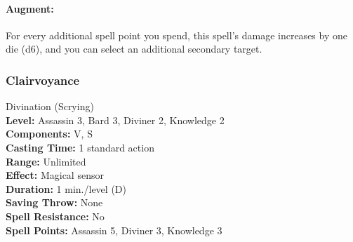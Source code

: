 \paragraph{Augment:} For every additional spell point you spend, 
this spell's damage increases by one die (d6), and you can select an additional secondary target.
% 
% 
% 

\subsubsection{Clairvoyance}
\label{Spell:Clairvoyance}
Divination (Scrying)
\\ \textbf{Level:} Assassin 3, Bard 3, Diviner 2, Knowledge 2
\\ \textbf{Components:} V, S
\\ \textbf{Casting Time:} 1 standard action
\\ \textbf{Range:} Unlimited
\\ \textbf{Effect:} Magical sensor
\\ \textbf{Duration:} 1 min./level (D)
\\ \textbf{Saving Throw:} None
\\ \textbf{Spell Resistance:} No
\\ \textbf{Spell Points:} Assassin 5, Diviner 3, Knowledge 3

